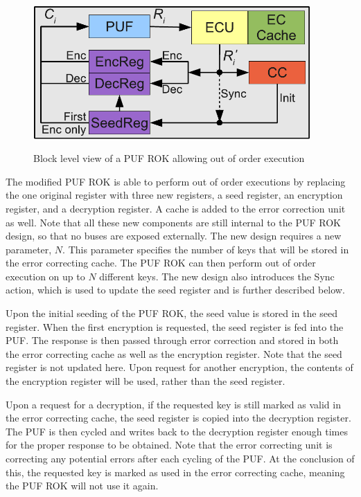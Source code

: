 \begin{figure}[!ht]
\includegraphics[width=400px]{images/rok_socreg.pdf}
\label{fig:rok}
\caption{Block level view of a PUF ROK allowing out of order execution}
\vspace{-20pt}
\end{figure}
\FloatBarrier

The modified PUF ROK is able to perform out of order executions by replacing the one original register with three
new registers, a seed register, an encryption register, and a decryption register. A cache is added to the error
correction unit as well. Note that all these new components are still internal to the PUF ROK design, so that no
buses are exposed externally.
The new design requires a new parameter, $N$. This parameter specifies the number of keys that will be stored in
the error correcting cache. The PUF ROK can then perform out of order execution on up to $N$ different keys.
The new design also introduces the Sync action, which is used to update the seed register and is further described
below.

Upon the initial seeding of the PUF ROK, the seed value is stored in the seed register. When the first encryption
is requested, the seed register is fed into the PUF. The response is then passed through error correction and stored
in both the error correcting cache as well as the encryption register. Note that the seed register is not updated here.
Upon request for another encryption, the contents of the encryption register will be used, rather than the seed register.

Upon a request for a decryption, if the requested key is still marked as valid in the error correcting cache,
the seed register is copied into the decryption register. The PUF is then cycled
and writes back to the decryption register enough times for the proper response to be obtained. Note that the
error correcting unit is correcting any potential errors after each cycling of the PUF. At the conclusion of this, the
requested key is marked as used in the error correcting cache, meaning the PUF ROK will not use it again.

